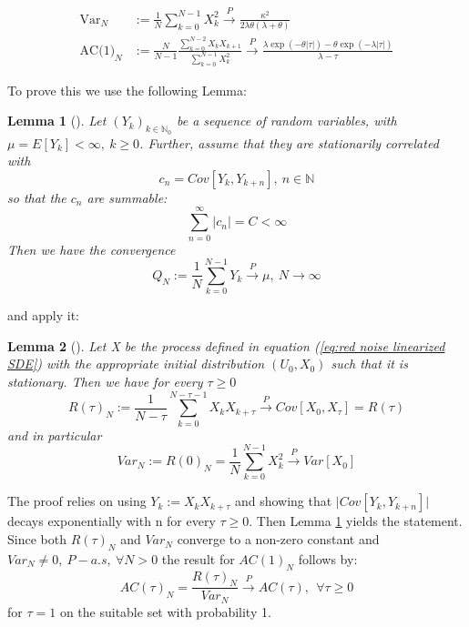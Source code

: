 \documentclass[%
thesis=student,%
coverpage=false,%
titlepage=false,%
headmarks=true, %
english,%
font=libertine, %
math=newpxtx, %
BCOR=5mm,%
coverBCOR=11mm%
]{tumbook}
\newtheorem{lemma}{Lemma}
\begin{document}
\begin{subequations}
        \begin{align*}
            \text{Var}_{N} &:= \frac{1}{N}\sum_{k=0}^{N-1}X_{k}^{2} \xrightarrow{P} \frac{\kappa^{2}}{2\lambda\theta(\lambda + \theta)} \\
            \text{AC(1)}_{N} &:= \frac{N}{N-1}\frac{\sum_{k=0}^{N-2}X_{k}X_{k+1}}{\sum_{k=0}^{N-1}X_{k}^{2}} \xrightarrow{P} \frac{\lambda\exp(-\theta\lvert\tau\rvert) - \theta\exp(-\lambda\lvert\tau\rvert)}{\lambda - \tau}
        \end{align*}
\end{subequations}

To prove this we use the following Lemma:

\begin{lemma}[\cite{Morr:2024SM}]
    Let $(Y_{k})_{k\in \mathbb{N}_{0}}$ be a sequence of random variables, with $\mu = E[Y_{k}] < \infty, \ k \geq 0$. Further, assume that they are stationarily correlated with
    \[
    c_{n} = Cov[Y_{k},Y_{k+n}], \ n \in \mathbb{N}
    \]
    so that the $c_{n}$ are summable:
    \[
    \sum_{n=0}^{\infty}\lvert c_{n} \rvert = C < \infty
    \]
    Then we have the convergence
    \[
    Q_{N} := \frac{1}{N}\sum_{k=0}^{N-1}Y_{k} \xrightarrow{P} \mu, \ N \rightarrow \infty
    \]
    \label{lemma:summable covariance}
\end{lemma}

and apply it:

\begin{lemma}[\cite{Morr:2024SM}]
    Let X be the process defined in equation (\ref{eq:red noise linearized SDE}) with the appropriate initial distribution $(U_{0},X_{0})$ such that it is stationary. Then we have for every $\tau \geq 0$
    \[
    R(\tau)_{N} := \frac{1}{N-\tau} \sum_{k=0}^{N-\tau -1} X_{k}X_{k+\tau} \xrightarrow{P} Cov[X_{0},X_{\tau}] = R(\tau)
    \]
    and in particular
    \[
    Var_{N} := R(0)_{N} = \frac{1}{N} \sum_{k=0}^{N-1} X_{k}^{2} \xrightarrow{P}Var[X_{0}]
    \]
    \label{lemma: consistent estimator proof}
\end{lemma}

The proof relies on using $Y_{k} := X_{k}X_{k+\tau}$ and showing that $\lvert Cov[Y_{k},Y_{k+n}] \rvert$ decays exponentially with n for every $\tau \geq 0$. Then Lemma \ref{lemma:summable covariance} yields the statement. Since both $R(\tau)_{N}$ and $Var_{N}$ converge to a non-zero constant and $Var_N \neq 0, \ P-a.s, \ \forall N > 0$ the result for $AC(1)_{N}$ follows by:
\[
AC(\tau)_N = \frac{R(\tau)_{N}}{Var_{N}} \xrightarrow{P} AC(\tau), \ \ \forall \tau \geq 0
\]
for $\tau = 1$ on the suitable set with probability 1.
\end{document}
